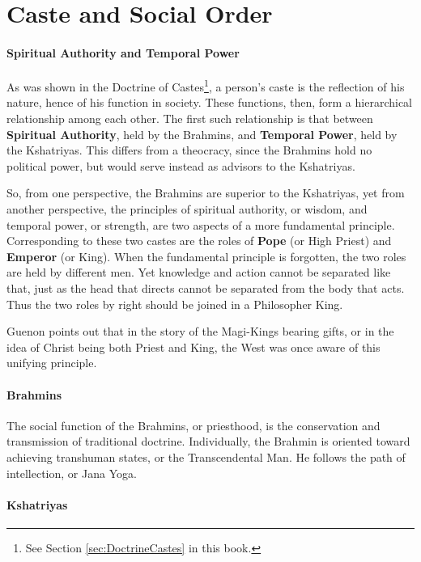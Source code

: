 \section{Caste and Social Order}

\paragraph{Spiritual Authority and Temporal Power}


As was shown in the Doctrine of Castes\footnote{See Section \ref{sec:DoctrineCastes} in this book.}, a person's caste is the reflection of his nature, hence of his function in society. These functions, then, form a hierarchical relationship among each other. The first such relationship is that between \textbf{Spiritual Authority}, held by the Brahmins, and \textbf{Temporal Power}, held by the Kshatriyas. This differs from a theocracy, since the Brahmins hold no political power, but would serve instead as advisors to the Kshatriyas.

So, from one perspective, the Brahmins are superior to the Kshatriyas, yet from another perspective, the principles of spiritual authority, or wisdom, and temporal power, or strength, are two aspects of a more fundamental principle. Corresponding to these two castes are the roles of \textbf{Pope} (or High Priest) and \textbf{Emperor} (or King). When the fundamental principle is forgotten, the two roles are held by different men. Yet knowledge and action cannot be separated like that, just as the head that directs cannot be separated from the body that acts. Thus the two roles by right should be joined in a Philosopher King.

Guenon points out that in the story of the Magi-Kings bearing gifts, or in the idea of Christ being both Priest and King, the West was once aware of this unifying principle.

\paragraph{Brahmins}


The social function of the Brahmins, or priesthood, is the conservation and transmission of traditional doctrine. Individually, the Brahmin is oriented toward achieving transhuman states, or the Transcendental Man. He follows the path of intellection, or Jana Yoga.

\paragraph{Kshatriyas}


